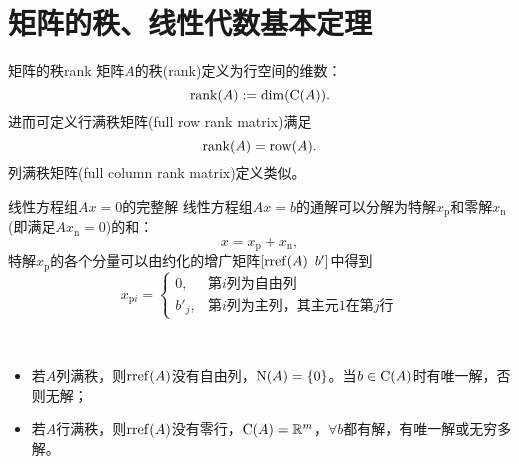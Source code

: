 \section{矩阵的秩、线性代数基本定理}
\begin{definition}{矩阵的秩}{rank}
	矩阵$A$的秩(rank)定义为行空间的维数：%
	\[
		\operatorname{rank}(A):=\dim(\operatorname{C}(A)).
	\]
	进而可定义行满秩矩阵(full row rank matrix)满足
	\[
		\operatorname{rank}(A)=\operatorname{row}(A).
	\]
	列满秩矩阵(full column rank matrix)定义类似。
\end{definition}
\begin{theorem}
	{线性方程组$Ax=0$的完整解}{}
	线性方程组$Ax=b$的通解可以分解为特解$x_{\mathrm p}$和零解$x_{\mathrm n}$ (即满足$Ax_{\mathrm n}=0$)的和：
	\[
		x=x_{\mathrm p}+x_{\mathrm n},
	\]
	特解$x_{\mathrm p}$的各个分量可以由约化的增广矩阵$[\operatorname{rref}(A)\enspace b']$中得到
	\[
		x_{{\mathrm p}i}=\begin{cases}
			0,&\text{第$i$列为自由列}\\
			b'_j,&\text{第$i$列为主列，其主元1在第$j$行}
		\end{cases}
	\]
\end{theorem}
\begin{corollary}
	~
	\begin{itemize}
		\item 若$A$列满秩，则$\operatorname{rref}(A)$没有自由列，$\operatorname{N}(A)=\{0\}$。当$b\in\operatorname{C}(A)$时有唯一解，否则无解；
		\item 若$A$行满秩，则$\operatorname{rref}(A)$没有零行，$\operatorname{C}(A)=\mathbb R^m$，$\forall b$都有解，有唯一解或无穷多解。
	\end{itemize}
\end{corollary}
